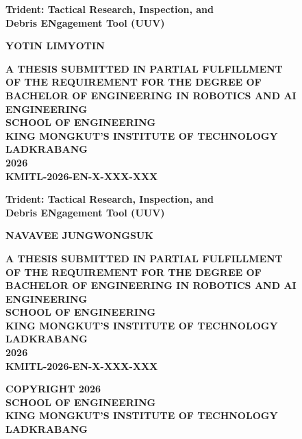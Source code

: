 \documentclass[12pt,a4paper]{report}
\begin{document}
\begin{titlepage}
	\centering
	\fontsize{18pt}{18pt}\bfseries Trident: Tactical Research, Inspection, and \\Debris ENgagement Tool (UUV) \\[1.5em]
	\vfill
	\begin{center}
		{\fontsize{18pt}{18pt}\bfseries YOTIN LIMYOTIN\par}
	\end{center}
	\vfill
	\vfill
	{\fontsize{18pt}{18pt}\bfseries
		A THESIS SUBMITTED IN PARTIAL FULFILLMENT \\ OF THE REQUIREMENT FOR THE DEGREE OF \\ BACHELOR OF ENGINEERING IN ROBOTICS AND AI ENGINEERING \\ SCHOOL OF ENGINEERING \\ KING MONGKUT'S INSTITUTE OF TECHNOLOGY LADKRABANG \\ 2026 \\ KMITL-2026-EN-X-XXX-XXX}
\end{titlepage}

\begin{titlepage}
	\centering
	\fontsize{18pt}{18pt}\bfseries Trident: Tactical Research, Inspection, and \\Debris ENgagement Tool (UUV) \\[1.5em]
	\vfill
	\begin{center}
		{\fontsize{18pt}{18pt}\bfseries NAVAVEE JUNGWONGSUK\par}
	\end{center}
	\vfill
	\vfill
	{\fontsize{18pt}{18pt}\bfseries
		A THESIS SUBMITTED IN PARTIAL FULFILLMENT \\ OF THE REQUIREMENT FOR THE DEGREE OF \\ BACHELOR OF ENGINEERING IN ROBOTICS AND AI ENGINEERING \\ SCHOOL OF ENGINEERING \\ KING MONGKUT'S INSTITUTE OF TECHNOLOGY LADKRABANG \\ 2026 \\ KMITL-2026-EN-X-XXX-XXX}
\end{titlepage}
\newpage
\thispagestyle{empty}
\vspace*{\fill}
    {\fontsize{18pt}{18pt}\bfseries
    \noindent
    COPYRIGHT 2026 \\
    SCHOOL OF ENGINEERING \\
    KING MONGKUT'S INSTITUTE OF TECHNOLOGY LADKRABANG}
\end{document}
